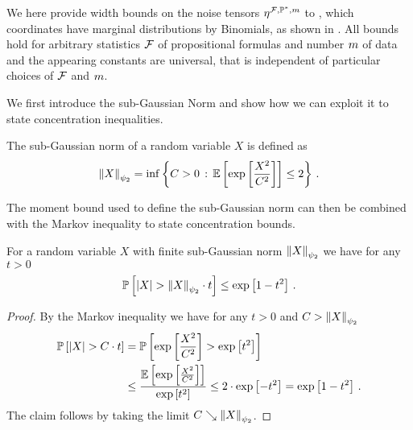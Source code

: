 \label{sec:widthBounds}

We here provide width bounds on the noise tensors $\eta^{\mathcal{F},\mathbb{P}^*,m}$ to \HybridLogicNetworks{}, which coordinates have marginal distributions by Binomials, as shown in .
All bounds hold for arbitrary statistics $\mathcal{F}$ of propositional formulas and number $m$ of data and the appearing constants are universal, that is independent of particular choices of $\mathcal{F}$ and $m$.


We first introduce the sub-Gaussian Norm and show how we can exploit it to state concentration inequalities.

\begin{definition}
    The sub-Gaussian norm of a random variable $X$ is defined as
    \begin{align*}
        \left\|X\right\|_{\psi_2} = \inf \left\{ C > 0 \,:\, \mathbb{E}\left[\mathrm{exp}\left[\frac{X^2}{C^2}\right]\right] \leq 2 \right\} \, .
    \end{align*}
\end{definition}

The moment bound used to define the sub-Gaussian norm can then be combined with the Markov inequality to state concentration bounds.

\begin{lemma}
    \label{lem:subGaussianTailBound}
    For a random variable $X$ with finite sub-Gaussian norm $\left\|X\right\|_{\psi_2}$ we have for any $t>0$
    \begin{align*}
        \mathbb{P}\left[\left|X\right| > \left\|X\right\|_{\psi_2} \cdot t\right] \leq \mathrm{exp}\left[1-t^2\right] \, .
    \end{align*}
\end{lemma}
\begin{proof}
    By the Markov inequality we have for any $t>0$ and $C>\left\|X\right\|_{\psi_2}$
    \begin{align*}
        \mathbb{P}\left[\left|X\right| > C \cdot t\right]
        & = \mathbb{P}\left[\mathrm{exp}\left[\frac{X^2}{C^2}\right] > \mathrm{exp}\left[t^2\right]\right] \\
        & \leq \frac{\mathbb{E}\left[\mathrm{exp}\left[\frac{X^2}{C^2}\right]\right]}{\mathrm{exp}\left[t^2\right]} \leq 2\cdot\mathrm{exp}\left[-t^2\right] = \mathrm{exp}\left[1-t^2\right] \, .
    \end{align*}
    The claim follows by taking the limit $C\searrow\left\|X\right\|_{\psi_2}$.
\end{proof}


